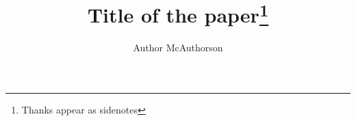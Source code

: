 \documentclass{tufte-handout}
\title{Title of the paper\thanks{Thanks appear as sidenotes}}
\author[Author McAuthorson]{Author McAuthorson}
\begin{document}
\maketitle%

\begin{abstract}
\noindent
\lipsum[1-1]
\end{abstract}

\lipsum[2-4]



\end{document}
